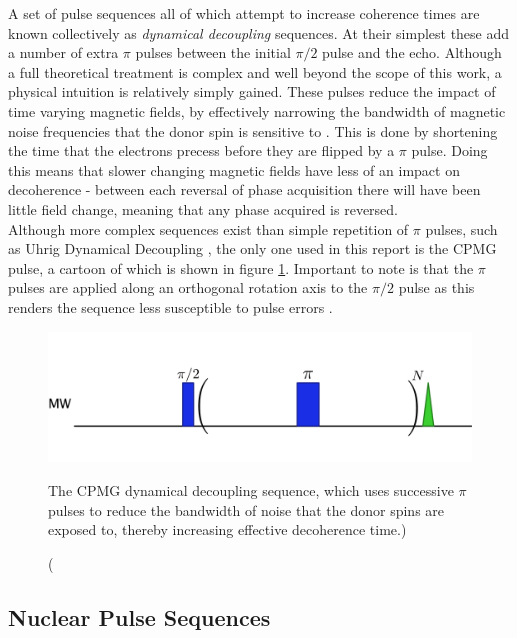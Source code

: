 A set of pulse sequences all of which attempt to increase coherence times are known collectively as \emph{dynamical decoupling} sequences.
At their simplest these add a number of extra $\pi$ pulses between the initial $\pi/2$ pulse and the echo.
Although a full theoretical treatment is complex and well beyond the scope of this work, a physical intuition is relatively simply gained.
These pulses reduce the impact of time varying magnetic fields, by effectively narrowing the bandwidth of magnetic noise frequencies that the donor spin is sensitive to \cite{Wang2009}. 
This is done by shortening the time that the electrons precess before they are flipped by a $\pi$ pulse. 
Doing this means that slower changing magnetic fields have less of an impact on decoherence - between each reversal of phase acquisition there will have been little field change, meaning that any phase acquired is reversed.
\\
Although more complex sequences exist than simple repetition of $\pi$ pulses, such as Uhrig Dynamical Decoupling \cite{Uhrig2008}, the only one used in this report is the CPMG pulse, a cartoon of which is shown in figure \ref{fig:CPMGpulse}.
Important to note is that the $\pi$ pulses are applied along an orthogonal rotation axis to the $\pi/2$ pulse as this renders the sequence less susceptible to pulse errors \cite{Carr1954,Meiboom1958}.


\begin{figure}
\centering
\includegraphics[width=\columnwidth]{Figures/CPMG.pdf}
\caption[CPMG pulse sequence](The CPMG dynamical decoupling sequence, which uses successive $\pi$ pulses to reduce the bandwidth of noise that the donor spins are exposed to, thereby increasing effective decoherence time.)
\label{fig:CPMGpulse}
\end{figure}

\subsection{Nuclear Pulse Sequences}

